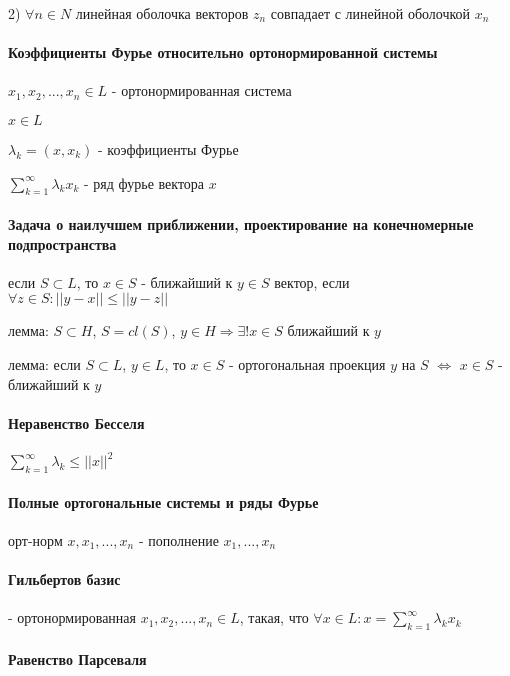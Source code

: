 \documentclass[russian,twocolumn]{article}
\begin{document}
2) $\forall n\in N$ линейная оболочка векторов $z_{n}$ совпадает с линейной оболочкой $x_{n}$

\paragraph{Коэффициенты Фурье относительно ортонормированной системы}

$x_1,x_2,...,x_n \in L$ - ортонормированная система

$x \in L$

$\lambda _k = (x, x_k)$ - коэффициенты Фурье

$\sum_{k=1}^{\infty}\lambda _k x_k$ - ряд фурье вектора $x$

\paragraph{Задача о наилучшем приближении, проектирование на конечномерные подпространства}

если $S \subset L$, то $x \in S$ - ближайший к $ y \in S$ вектор, если $\forall z \in S : ||y-x||\le||y-z||$

лемма: $S \subset H$, $S=cl(S)$, $y \in H \Rightarrow \exists ! x \in S$ ближайший к $y$

лемма: если $S \subset L$, $y \in L$, то $x \in S$ - ортогональная проекция $y$ на $S$ $\iff$ $x \in S$ - ближайший к $y$ 

\paragraph{Неравенство Бесселя}

$\sum _{k=1}^\infty \lambda _k \le ||x||^2$

\paragraph{Полные ортогональные системы и ряды Фурье}

орт-норм $x, x_1, ..., x_n$ - пополнение $x_1, ..., x_n$



\paragraph{Гильбертов базис}

- ортонормированная $x_1,x_2,...,x_n \in L$, такая, что $\forall x \in L : x=\sum _{k=1}^\infty \lambda _k x_k$ 

\paragraph{Равенство Парсеваля}
\end{document}
